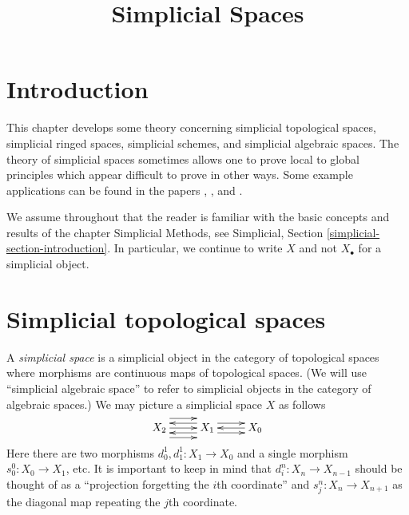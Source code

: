 \documentclass{stacks-project}
\theoremstyle{plain}
\theoremstyle{definition}
\theoremstyle{remark}
\numberwithin{equation}{subsection}
\begin{document}
\title{Simplicial Spaces}


\maketitle

\label{section-phantom}

\tableofcontents

\section{Introduction}
\label{section-introduction}

\noindent
This chapter develops some theory concerning simplicial topological spaces,
simplicial ringed spaces, simplicial schemes, and simplicial algebraic spaces.
The theory of simplicial spaces sometimes allows one to prove local to global
principles which appear difficult to prove in other ways.
Some example applications can be found in the papers
\cite{faltings_finiteness}, \cite{Kiehl}, and \cite{HodgeIII}.

\medskip\noindent
We assume throughout that the reader is familiar with the basic concepts
and results of the chapter Simplicial Methods, see
Simplicial, Section \ref{simplicial-section-introduction}.
In particular, we continue to write $X$ and not $X_\bullet$
for a simplicial object.








\section{Simplicial topological spaces}
\label{section-simplicial-top}

\noindent
A {\it simplicial space} is a simplicial object in the category of
topological spaces where morphisms are continuous maps of topological
spaces. (We will use ``simplicial algebraic space'' to refer to simplicial
objects in the category of algebraic spaces.)
We may picture a simplicial space $X$ as follows
$$
\xymatrix{
X_2
\ar@<2ex>[r]
\ar@<0ex>[r]
\ar@<-2ex>[r]
&
X_1
\ar@<1ex>[r]
\ar@<-1ex>[r]
\ar@<1ex>[l]
\ar@<-1ex>[l]
&
X_0
\ar@<0ex>[l]
}
$$
Here there are two morphisms $d^1_0, d^1_1 : X_1 \to X_0$
and a single morphism $s^0_0 : X_0 \to X_1$, etc.
It is important to keep in mind that $d^n_i : X_n \to X_{n - 1}$
should be thought of as a ``projection forgetting the
$i$th coordinate'' and $s^n_j : X_n \to X_{n + 1}$ as the diagonal
map repeating the $j$th coordinate.
\end{document}
